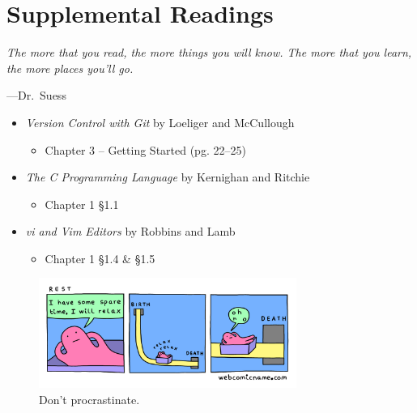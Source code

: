 \documentclass[11pt]{article}
\begin{document}

\section{Supplemental Readings}
\epigraph{\emph{The more that you read, the more things you will know. The
more that you learn, the more places you'll go.}}{---Dr.\ Suess}\noindent

\begin{itemize}

	\item \textit{Version Control with Git} by Loeliger and McCullough
	\begin{itemize}
		\item Chapter 3 -- Getting Started (pg. 22--25)
	\end{itemize}

	\item \textit{The C Programming Language} by Kernighan and Ritchie
	\begin{itemize}
		\item Chapter 1 \S 1.1
	\end{itemize}

	\item \textit{vi and Vim Editors} by Robbins and Lamb
	\begin{itemize}
		\item Chapter 1 \S 1.4 \& \S 1.5
	\end{itemize}

\end{itemize}
\begin{figure}[h!]
  \centering
    \includegraphics[width=0.75\textwidth]{procrastination.png}
	\caption{Don't procrastinate.}
\end{figure}
\end{document}

